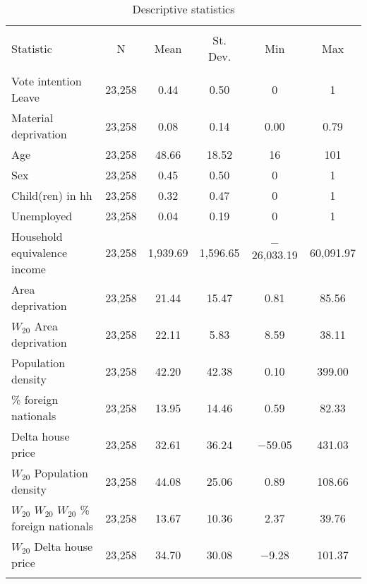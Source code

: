  
\begin{table}[!htbp] \centering 
  \caption{Descriptive statistics} 
  \label{tab:desc} 
\scriptsize 
\begin{tabular}{@{\extracolsep{5pt}}lccccc} 
\\[-1.8ex]\hline 
\hline \\[-1.8ex] 
Statistic & \multicolumn{1}{c}{N} & \multicolumn{1}{c}{Mean} & \multicolumn{1}{c}{St. Dev.} & \multicolumn{1}{c}{Min} & \multicolumn{1}{c}{Max} \\ 
\hline \\[-1.8ex] 
Vote intention Leave & 23,258 & 0.44 & 0.50 & 0 & 1 \\ 
Material deprivation & 23,258 & 0.08 & 0.14 & 0.00 & 0.79 \\ 
Age & 23,258 & 48.66 & 18.52 & 16 & 101 \\ 
Sex & 23,258 & 0.45 & 0.50 & 0 & 1 \\ 
Child(ren) in hh & 23,258 & 0.32 & 0.47 & 0 & 1 \\ 
Unemployed & 23,258 & 0.04 & 0.19 & 0 & 1 \\ 
Household equivalence income & 23,258 & 1,939.69 & 1,596.65 & $-$26,033.19 & 60,091.97 \\ 
Area deprivation & 23,258 & 21.44 & 15.47 & 0.81 & 85.56 \\ 
$W_{20}$ Area deprivation & 23,258 & 22.11 & 5.83 & 8.59 & 38.11 \\ 
Population density & 23,258 & 42.20 & 42.38 & 0.10 & 399.00 \\ 
\% foreign nationals & 23,258 & 13.95 & 14.46 & 0.59 & 82.33 \\ 
Delta house price & 23,258 & 32.61 & 36.24 & $-$59.05 & 431.03 \\ 
$W_{20}$ Population density & 23,258 & 44.08 & 25.06 & 0.89 & 108.66 \\ 
$W_{20}$ %
$W_{20}$ %
$W_{20}$ \% foreign nationals & 23,258 & 13.67 & 10.36 & 2.37 & 39.76 \\ 
$W_{20}$ Delta house price & 23,258 & 34.70 & 30.08 & $-$9.28 & 101.37 \\ 
\hline \\[-1.8ex] 
\end{tabular} 
\end{table} 
